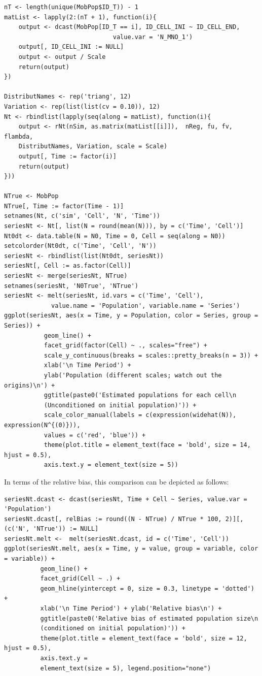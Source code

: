 \documentclass[12pt, a4paper]{article}
\begin{document}
\begin{verbatim}
nT <- length(unique(MobPop$ID_T)) - 1
matList <- lapply(2:(nT + 1), function(i){
    output <- dcast(MobPop[ID_T == i], ID_CELL_INI ~ ID_CELL_END, 
                              value.var = 'N_MNO_1')
    output[, ID_CELL_INI := NULL]
    output <- output / Scale
    return(output)
})

DistributNames <- rep('triang', 12)
Variation <- rep(list(list(cv = 0.10)), 12)
Nt <- rbindlist(lapply(seq(along = matList), function(i){
    output <- rNt(nSim, as.matrix(matList[[i]]),  nReg, fu, fv, flambda, 
    DistributNames, Variation, scale = Scale)
    output[, Time := factor(i)]
    return(output)
}))

NTrue <- MobPop
NTrue[, Time := factor(Time - 1)]
setnames(Nt, c('sim', 'Cell', 'N', 'Time'))
seriesNt <- Nt[, list(N = round(mean(N))), by = c('Time', 'Cell')]
Nt0dt <- data.table(N = N0, Time = 0, Cell = seq(along = N0))
setcolorder(Nt0dt, c('Time', 'Cell', 'N'))
seriesNt <- rbindlist(list(Nt0dt, seriesNt))
seriesNt[, Cell := as.factor(Cell)]
seriesNt <- merge(seriesNt, NTrue)
setnames(seriesNt, 'N0True', 'NTrue')
seriesNt <- melt(seriesNt, id.vars = c('Time', 'Cell'), 
             value.name = 'Population', variable.name = 'Series')
ggplot(seriesNt, aes(x = Time, y = Population, color = Series, group = Series)) + 
           geom_line() + 
           facet_grid(factor(Cell) ~ ., scales="free") +
           scale_y_continuous(breaks = scales::pretty_breaks(n = 3)) +
           xlab('\n Time Period') + 
           ylab('Population (different scales; watch out the origins)\n') +
           ggtitle(paste0('Estimated populations for each cell\n 
           (Unconditioned on initial population)')) +
           scale_color_manual(labels = c(expression(widehat(N)), expression(N^{(0)})), 
           values = c('red', 'blue')) +
           theme(plot.title = element_text(face = 'bold', size = 14, hjust = 0.5), 
           axis.text.y = element_text(size = 5))
\end{verbatim}


In terms of the relative bias, this comparison can be depicted as follows:
\begin{verbatim}
seriesNt.dcast <- dcast(seriesNt, Time + Cell ~ Series, value.var = 'Population')
seriesNt.dcast[, relBias := round((N - NTrue) / NTrue * 100, 2)][, (c('N', 'NTrue')) := NULL]
seriesNt.melt <-  melt(seriesNt.dcast, id = c('Time', 'Cell'))
ggplot(seriesNt.melt, aes(x = Time, y = value, group = variable, color = variable)) + 
          geom_line() + 
          facet_grid(Cell ~ .) +
          geom_hline(yintercept = 0, size = 0.3, linetype = 'dotted') + 
          xlab('\n Time Period') + ylab('Relative bias\n') +
          ggtitle(paste0('Relative bias of estimated population size\n 
          (conditioned on initial population)')) +
          theme(plot.title = element_text(face = 'bold', size = 12, hjust = 0.5), 
          axis.text.y =
          element_text(size = 5), legend.position="none")
\end{verbatim}
\end{document}
